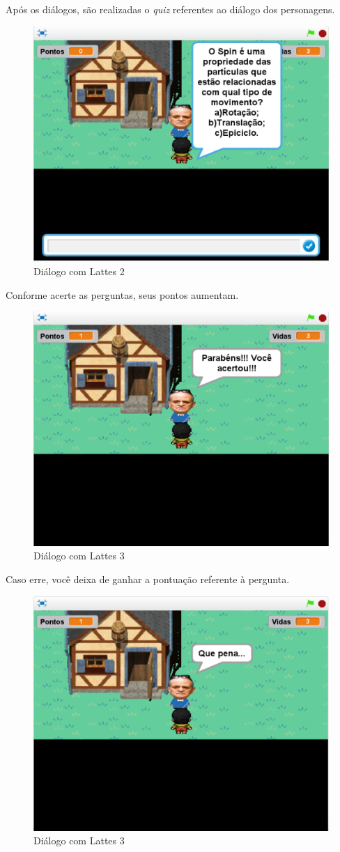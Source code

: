 \documentclass[12pt,fleqn]{book} %
\begin{document}
\newpage

Após os diálogos, são realizadas o \textit{quiz} referentes ao diálogo dos personagens.

\begin{figure}[h]
	\centering
	\includegraphics[width=0.65 \textwidth]{Produto/jogo_10}
	\caption{Diálogo com Lattes 2}
	\label{fig:app_a:jogo10}
\end{figure}

Conforme acerte as perguntas, seus pontos aumentam.

\begin{figure}[h]
	\centering
	\includegraphics[width=0.65 \textwidth]{Produto/jogo_11}
	\caption{Diálogo com Lattes 3}
	\label{fig:app_a:jogo11}
\end{figure}

\newpage

Caso erre, você deixa de ganhar a pontuação referente à pergunta.

\begin{figure}[h]
	\centering
	\includegraphics[width=0.65 \textwidth]{Produto/jogo_12}
	\caption{Diálogo com Lattes 3}
	\label{fig:app_a:jogo12}
\end{figure}
\end{document}

